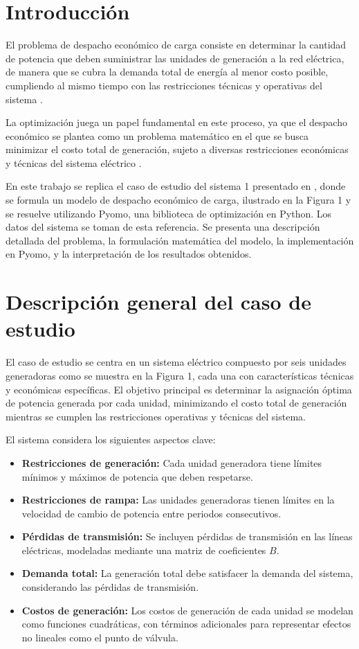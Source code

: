 \documentclass[11pt]{article}
\begin{document}
\section{Introducción}	
El problema de despacho económico de carga consiste en determinar la cantidad de potencia que deben suministrar las unidades de generación a la red eléctrica, de manera que se cubra la demanda total de energía al menor costo posible, cumpliendo al mismo tiempo con las restricciones técnicas y operativas del sistema \citep{en17030550}.

La optimización juega un papel fundamental en este proceso, ya que el despacho económico se plantea como un problema matemático en el que se busca minimizar el costo total de generación, sujeto a diversas restricciones económicas y técnicas del sistema eléctrico \citep{osti_6202356}.

En este trabajo se replica el caso de estudio del sistema 1 presentado en \citep{electronics9010108}, donde se formula un modelo de despacho económico de carga, ilustrado en la Figura 1 y se resuelve utilizando Pyomo, una biblioteca de optimización en Python. Los datos del sistema se toman de esta referencia. Se presenta una descripción detallada del problema, la formulación matemática del modelo, la implementación en Pyomo, y la interpretación de los resultados obtenidos.

\newpage
\section{Descripción general del caso de estudio}

El caso de estudio se centra en un sistema eléctrico compuesto por seis unidades generadoras como se muestra en la Figura 1, cada una con características técnicas y económicas específicas. El objetivo principal es determinar la asignación óptima de potencia generada por cada unidad, minimizando el costo total de generación mientras se cumplen las restricciones operativas y técnicas del sistema.

El sistema considera los siguientes aspectos clave:
\begin{itemize}
    \item \textbf{Restricciones de generación:} Cada unidad generadora tiene límites mínimos y máximos de potencia que deben respetarse.
    \item \textbf{Restricciones de rampa:} Las unidades generadoras tienen límites en la velocidad de cambio de potencia entre periodos consecutivos.
    \item \textbf{Pérdidas de transmisión:} Se incluyen pérdidas de transmisión en las líneas eléctricas, modeladas mediante una matriz de coeficientes \( B \).
    \item \textbf{Demanda total:} La generación total debe satisfacer la demanda del sistema, considerando las pérdidas de transmisión.
    \item \textbf{Costos de generación:} Los costos de generación de cada unidad se modelan como funciones cuadráticas, con términos adicionales para representar efectos no lineales como el punto de válvula.
\end{itemize}
\end{document}

